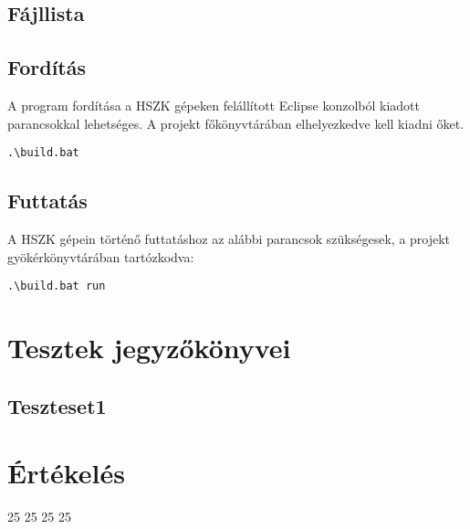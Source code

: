 \subsection{Fájllista}


\subsection{Fordítás}
A program fordítása a HSZK gépeken felállított Eclipse konzolból kiadott parancsokkal lehetséges.
A projekt főkönyvtárában elhelyezkedve kell kiadni őket.

\lstset{escapeinside=`', xleftmargin=10pt, frame=single, basicstyle=\ttfamily\footnotesize, language=sh}
\begin{lstlisting}
.\build.bat
\end{lstlisting}

\subsection{Futtatás}
A HSZK gépein történő futtatáshoz az alábbi parancsok szükségesek, a projekt gyökérkönyvtárában tartózkodva:

\lstset{escapeinside=`', xleftmargin=10pt, frame=single, basicstyle=\ttfamily\footnotesize, language=sh}
\begin{lstlisting}
.\build.bat run
\end{lstlisting}

\section{Tesztek jegyzőkönyvei}

\subsection{Teszteset1}




\section{Értékelés}
\begin{ertekeles}
{25}        %
{25}
{25}
{25}
\end{ertekeles}

